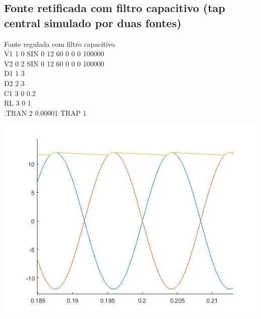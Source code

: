 \documentclass[12pt]{article}
\begin{document}
\subsection{Fonte retificada com filtro capacitivo (tap central simulado por duas fontes)}
  Fonte regulada com filtro capacitivo\\
  V1 1 0 SIN 0 12 60 0 0 0 100000\\
  V2 0 2 SIN 0 12 60 0 0 0 100000\\
  D1 1 3\\
  D2 2 3\\
  C1 3 0 0.2\\
  RL 3 0 1\\
  .TRAN 2 0.00001 TRAP 1\\

  \begin{center}
  \hspace*{-2.5cm}\includegraphics[scale=0.75]{fonteCapacitor}
  \end{center}
\pagebreak
\end{document}
